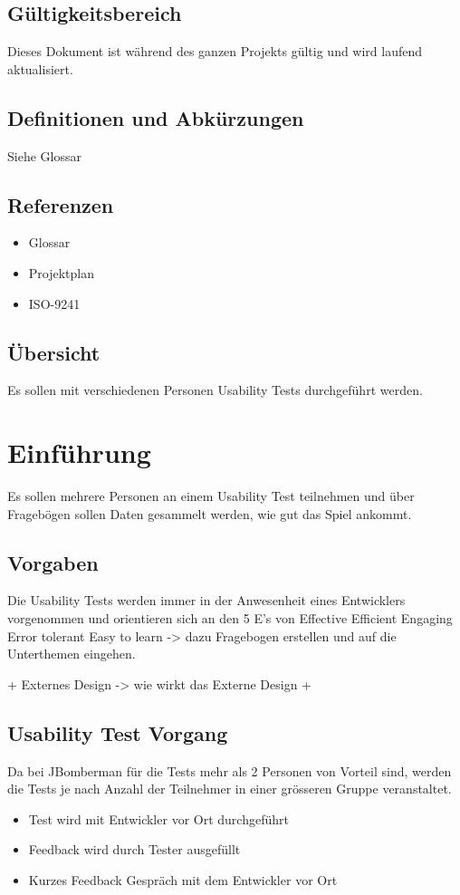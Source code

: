 \documentclass[11pt]{scrartcl}
\begin{document}
\subsection{Gültigkeitsbereich}
Dieses Dokument ist während des ganzen Projekts gültig und wird laufend aktualisiert.
\subsection{Definitionen und Abkürzungen}
Siehe Glossar
\subsection{Referenzen}
\begin{itemize}
  \item Glossar
  \item Projektplan
  \item ISO-9241
\end{itemize}
\subsection{Übersicht}
Es sollen mit verschiedenen Personen Usability Tests durchgeführt werden.

\section{Einführung}
Es sollen mehrere Personen an einem Usability Test teilnehmen und über 
Fragebögen sollen Daten gesammelt werden, wie gut das Spiel ankommt.

\subsection{Vorgaben}
Die Usability Tests werden immer in der Anwesenheit eines Entwicklers 
vorgenommen und orientieren sich an den 5 E's von
Effective
Efficient
Engaging
Error tolerant
Easy to learn -> dazu Fragebogen erstellen und auf die Unterthemen eingehen.

+ Externes Design -> wie wirkt das Externe Design
+ 

\subsection{Usability Test Vorgang}
Da bei JBomberman für die Tests mehr als 2 Personen von Vorteil sind, werden die 
Tests je nach Anzahl der Teilnehmer in einer grösseren Gruppe veranstaltet.
\begin{itemize}
  \item Test wird mit Entwickler vor Ort durchgeführt
  \item Feedback wird durch Tester ausgefüllt
  \item Kurzes Feedback Gespräch mit dem Entwickler vor Ort
\end{itemize}
\end{document}
